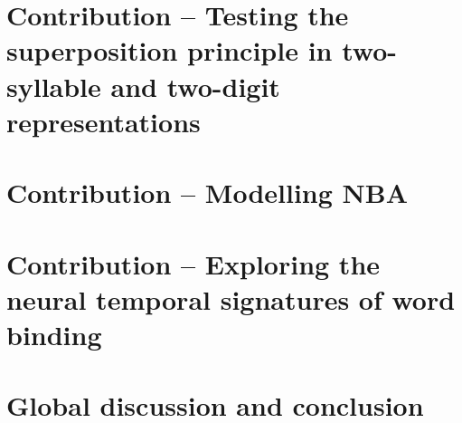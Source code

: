 \documentclass[twoside, justified, notoc, nobib, 
	nohyper]{tufte-book}
\begin{document}
\part{Contribution -- Testing the superposition principle in two-syllable and two-digit representations}
\cleardoublepage
%
% 

\FloatBarrier
% 


\part{Contribution -- Modelling NBA}
\cleardoublepage
% 
% 
% 
% 


\part{Contribution -- Exploring the neural temporal signatures of word binding}
\cleardoublepage
% 
% 
% 
% 


\part{Global discussion and conclusion}
\cleardoublepage
%
%
\cleardoublepage


\backmatter 



\clearpage
%
\end{document}
